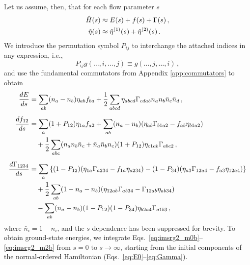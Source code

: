 Let us assume, then, that for each flow parameter $s$
\begin{align}
  \hat{H}(s) &\approx E(s) + f(s) + \Gamma(s)\,,\\
  \hat{\eta}(s) &\approx\hat{\eta}^{(1)}(s)+\hat{\eta}^{(2)}(s)\,.
\end{align}
We introduce the permutation symbol $P_{ij}$ to interchange the attached indices in any expression, i.e.,
\begin{equation}\label{eq:def_Pij}
  P_{ij} g(\ldots,i,\ldots,j) \equiv g(\ldots,j,\ldots,i)\,,
\end{equation}
and use the fundamental commutators from Appendix \ref{app:commutators} to obtain
\begin{align}
  \totd{E}{s}&= \sum_{ab}(n_a-n_b)\eta_{ab} f_{ba} 
    + \frac{1}{2} \sum_{abcd}\eta_{abcd}\Gamma_{cdab} n_a n_b\bar{n}_c\bar{n}_d
    \label{eq:imsrg2_m0b}\,,\\[5pt]
% 
  \totd{f_{12}}{s} &= 
  \sum_{a}(1+P_{12})\eta_{1a}f_{a2} +\sum_{ab}(n_a-n_b)(\eta_{ab}\Gamma_{b1a2}-f_{ab}\eta_{b1a2}) \notag\\ 
  &\quad +\frac{1}{2}\sum_{abc}(n_an_b\bar{n}_c+\bar{n}_a\bar{n}_bn_c) (1+P_{12})\eta_{c1ab}\Gamma_{abc2}
  \label{eq:imsrg2_m1b}\,,\\[5pt]
% 
  \totd{\Gamma_{1234}}{s}&= 
  \sum_{a}\left\{ 
    (1-P_{12})(\eta_{1a}\Gamma_{a234}-f_{1a}\eta_{a234} )
    -(1-P_{34})(\eta_{a3}\Gamma_{12a4}-f_{a3}\eta_{12a4} )
    \right\}\notag \\
  &\quad+ \frac{1}{2}\sum_{ab}(1-n_a-n_b)(\eta_{12ab}\Gamma_{ab34}-\Gamma_{12ab}\eta_{ab34})
    \notag\\
  &\quad-\sum_{ab}(n_a-n_b) (1-P_{12})(1-P_{34})\eta_{b2a4}\Gamma_{a1b3}
    \label{eq:imsrg2_m2b}\,,
\end{align}
where $\bar{n}_i=1-n_i$, and the $s$-dependence has been suppressed for brevity. To obtain ground-state energies, we integrate Eqs.~\eqref{eq:imsrg2_m0b}--\eqref{eq:imsrg2_m2b} from $s=0$ to $s\to\infty$, starting from the initial 
components of the normal-ordered Hamiltonian (Eqs.~\eqref{eq:E0}--\eqref{eq:Gamma}).

